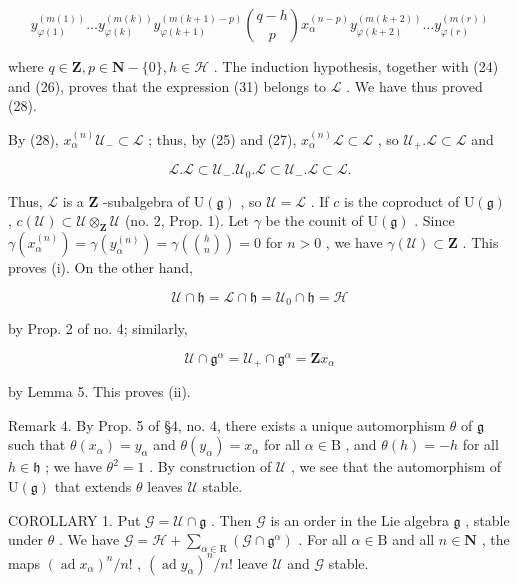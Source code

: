 \[
y _ {\varphi (1)} ^ {(m (1))} \dots y _ {\varphi (k)} ^ {(m (k))} y _ {\varphi (k + 1)} ^ {(m (k + 1) - p)} \binom{q - h}{p} x _ {\alpha} ^ {(n - p)} y _ {\varphi (k + 2)} ^ {(m (k + 2))} \dots y _ {\varphi (r)} ^ {(m (r))}\tag{31}
\]

where \(q \in \mathbf{Z}, p \in \mathbf{N} - \{0\}, h \in \mathcal{H}\) . The induction hypothesis, together with (24) and (26), proves that the expression (31) belongs to \(\mathcal{L}\) . We have thus proved (28).

By (28), \(x_{\alpha}^{(n)}\mathcal{U}_{-}\subset \mathcal{L}\) ; thus, by (25) and (27), \(x_{\alpha}^{(n)}\mathcal{L}\subset \mathcal{L}\) , so \(\mathcal{U}_{+}.\mathcal{L}\subset \mathcal{L}\) and

\[
\mathcal {L}. \mathcal {L} \subset \mathcal {U} _ {-}. \mathcal {U} _ {0}. \mathcal {L} \subset \mathcal {U} _ {-}. \mathcal {L} \subset \mathcal {L}.
\]

Thus, \(\mathcal{L}\) is a \(\mathbf{Z}\) -subalgebra of \(\mathrm{U}(\mathfrak{g})\) , so \(\mathcal{U} = \mathcal{L}\) . If \(c\) is the coproduct of \(\mathrm{U}(\mathfrak{g})\) , \(c(\mathcal{U}) \subset \mathcal{U} \otimes_{\mathbf{Z}} \mathcal{U}\) (no. 2, Prop. 1). Let \(\gamma\) be the counit of \(\mathrm{U}(\mathfrak{g})\) . Since \(\gamma(x_{\alpha}^{(n)}) = \gamma(y_{\alpha}^{(n)}) = \gamma\left(\binom{h}{n}\right) = 0\) for \(n > 0\) , we have \(\gamma(\mathcal{U}) \subset \mathbf{Z}\) . This proves (i). On the other hand,

\[
\mathcal {U} \cap \mathfrak {h} = \mathcal {L} \cap \mathfrak {h} = \mathcal {U} _ {0} \cap \mathfrak {h} = \mathcal {H}
\]

by Prop. 2 of no. 4; similarly,

\[
\mathcal {U} \cap \mathfrak {g} ^ {\alpha} = \mathcal {U} _ {+} \cap \mathfrak {g} ^ {\alpha} = \mathbf {Z} x _ {\alpha}
\]

by Lemma 5. This proves (ii).

Remark 4. By Prop. 5 of §4, no. 4, there exists a unique automorphism \(\theta\) of \(\mathfrak{g}\) such that \(\theta(x_{\alpha}) = y_{\alpha}\) and \(\theta(y_{\alpha}) = x_{\alpha}\) for all \(\alpha \in \mathrm{B}\) , and \(\theta(h) = -h\) for all \(h \in \mathfrak{h}\) ; we have \(\theta^2 = 1\) . By construction of \(\mathcal{U}\) , we see that the automorphism of \(\mathrm{U}(\mathfrak{g})\) that extends \(\theta\) leaves \(\mathcal{U}\) stable.

COROLLARY 1. Put \(\mathcal{G} = \mathcal{U} \cap \mathfrak{g}\) . Then \(\mathcal{G}\) is an order in the Lie algebra \(\mathfrak{g}\) , stable under \(\theta\) . We have \(\mathcal{G} = \mathcal{H} + \sum_{\alpha \in \mathrm{R}} (\mathcal{G} \cap \mathfrak{g}^{\alpha})\) . For all \(\alpha \in \mathrm{B}\) and all \(n \in \mathbf{N}\) , the maps \((\operatorname{ad} x_{\alpha})^{n} / n!\) , \((\operatorname{ad} y_{\alpha})^{n} / n!\) leave \(\mathcal{U}\) and \(\mathcal{G}\) stable.

